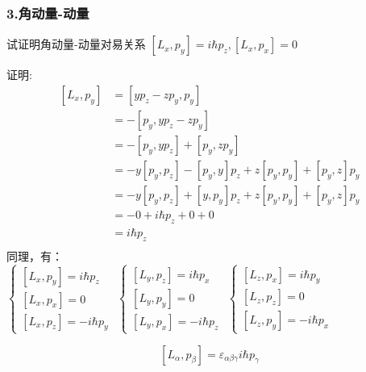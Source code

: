 \begin{frame} [allowframebreaks=]
    \frametitle{3.角动量-动量}
    \begin{exampleblock}{}
     试证明角动量-动量对易关系 $[L_x,p_y]=i\hbar p_z,  [L_x,p_x]=0$
    \end{exampleblock}
    \alert{证明:} 
    \begin{equation*}
        \begin{split}
        [L_x,p_y]&= [yp_z-zp_y,p_y]\\
        &=-[p_y,yp_z-zp_y]\\
        &=-[p_y,yp_z] + [p_y,zp_y]\\
        &=-y[p_y,p_z] -[p_y,y]p_z + z[p_y,p_y] + [p_y,z]p_y\\
        &=-y[p_y,p_z] +[y,p_y]p_z + z[p_y,p_y] + [p_y,z]p_y\\
        &=-0 + i\hbar p_z + 0+0\\
        &=i\hbar p_z \\
        \end{split}  
    \end{equation*}
    同理，有：\\
    $\begin{cases}
        [L_x,p_y]= i\hbar p_z  \\ 
        [L_x,p_x]= 0  \\ 
        [L_x,p_z]= -i\hbar p_y 
    \end{cases}$
    $\begin{cases}
        [L_y,p_z]= i\hbar p_x  \\ 
        [L_y,p_y]= 0  \\ 
        [L_y,p_x]= -i\hbar p_z 
    \end{cases}$
    $\begin{cases}
        [L_z,p_x]= i\hbar p_y  \\ 
        [L_z,p_z]= 0  \\ 
        [L_z,p_y]= -i\hbar p_x 
    \end{cases}$
    \begin{tcolorbox}[colback=yellow!5,colframe=red!75!black,title=角动量-动量对易关系]
        $$ [L_\alpha,p_\beta]= \varepsilon_{\alpha\beta\gamma} i\hbar p_\gamma $$ 
    \end{tcolorbox}
\end{frame} 


